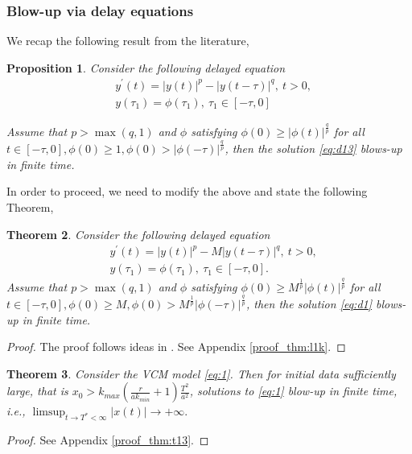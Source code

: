 \documentclass[sn-mathphys-num]{sn-jnl}
\newtheorem{theorem}{Theorem}[section]
\newtheorem{proposition}[theorem]{Proposition}
\numberwithin{equation}{section}
\numberwithin{equation}{section}
\begin{document}
\subsubsection{Blow-up via delay equations}
We recap the following result from the literature, \cite{Ez06}

\begin{proposition}
Consider the following delayed equation
\begin{equation}
\label{eq:d13}
\begin{aligned}
& y^{'}(t) = |y(t)|^{p} - |y(t-\tau)|^{q}, \ t>0,  \\
& y(\tau_{1}) = \phi(\tau_{1}), \ \tau_{1} \in [-\tau,0]
\end{aligned}
    \end{equation}


Assume that $p > \max{(q,1)}$ and $\phi$ satisfying $\phi(0) \geq |\phi(t)|^ {\frac{q}{p}}$ for all $t \in [- \tau,0], \phi(0) \geq  1, \phi(0) > |\phi(-\tau)|^{\frac{q}{p}}$, then the solution \eqref{eq:d13} blows-up in finite time.
\end{proposition}
In order to proceed, we need to modify the above and state the following Theorem,
\begin{theorem}
\label{thm:l1k}
    Consider the following delayed equation
\begin{equation}
\label{eq:d1}
\begin{aligned}
& y^{'}(t) = |y(t)|^{p} - M|y(t-\tau)|^{q}, \ t>0, \\
& y(\tau_{1}) = \phi(\tau_{1}), \ \tau_{1} \in [-\tau,0]. 
\end{aligned}
    \end{equation}
Assume that $p > \max{(q,1)}$ and $\phi$ satisfying $\phi(0)  \geq M^{\frac{1}{p}}|\phi(t)|^{\frac{q}{p}}$ for all $t \in [- \tau,0], \phi(0) \geq M, \phi(0) > M^{\frac{1}{p}}|\phi(-\tau)|^{\frac{q}{p}}$, then the solution \eqref{eq:d1} blows-up in finite time.
\end{theorem}

\begin{proof}
   
The proof follows ideas in \cite{Ez06}. See Appendix \ref{proof_thm:l1k}.
\end{proof}
\begin{theorem}
\label{thm:t13}
Consider the VCM model \eqref{eq:1}. Then for initial data sufficiently large, that is $x_{0} > k_{max}\left( \frac{r}{a k_{min}}  + 1 \right)\frac{T^{2}}{a^{2}} $, solutions to 
\eqref{eq:1} blow-up in finite time, i.e., $\limsup_{t \rightarrow T^{*} < \infty} |x(t)| \rightarrow + \infty.$

\end{theorem}
\begin{proof}
    See Appendix \ref{proof_thm:t13}.
\end{proof}
\end{document}
